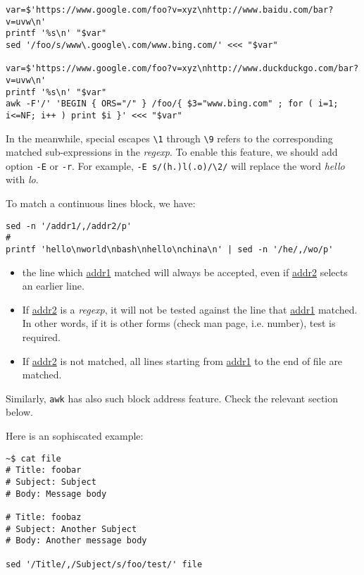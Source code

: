 \begin{minipage}{1.0\linewidth}
\begin{lstlisting}
var=$'https://www.google.com/foo?v=xyz\nhttp://www.baidu.com/bar?v=uvw\n'
printf '%s\n' "$var"
sed '/foo/s/www\.google\.com/www.bing.com/' <<< "$var"

var=$'https://www.google.com/foo?v=xyz\nhttp://www.duckduckgo.com/bar?v=uvw\n'
printf '%s\n' "$var"
awk -F'/' 'BEGIN { ORS="/" } /foo/{ $3="www.bing.com" ; for ( i=1; i<=NF; i++ ) print $i }' <<< "$var"
\end{lstlisting}
\end{minipage}

In the meanwhile, special escapes \lstinline|\1| through
\lstinline|\9| refers to the corresponding matched sub-expressions
in the \textit{regexp}. To enable this feature, we should add
option \lstinline|-E| or \lstinline|-r|. For example,
\lstinline|-E s/(h.)l(.o)/\2/| will replace the word
\textit{hello} with \textit{lo}.

To match a continuous lines block, we have:

\begin{lstlisting}
sed -n '/addr1/,/addr2/p'
#
printf 'hello\nworld\nbash\nhello\nchina\n' | sed -n '/he/,/wo/p'
\end{lstlisting}

\begin{itemize}
\item the line which \uline{addr1} matched will always be
  accepted, even if \uline{addr2} selects an earlier line.
\item If \uline{addr2} is a \textit{regexp}, it will not be tested
  against the line that \uline{addr1} matched. In other words, if
  it is other forms (check man page, i.e. number), test is
  required.
\item If \uline{addr2} is not matched, all lines starting from
  \uline{addr1} to the end of file are matched.
\end{itemize}

Similarly, \lstinline|awk| has also such block address
feature. Check the relevant section below.

Here is an sophiscated example:

\begin{lstlisting}
~$ cat file
# Title: foobar
# Subject: Subject
# Body: Message body

# Title: foobaz
# Subject: Another Subject
# Body: Another message body

sed '/Title/,/Subject/s/foo/test/' file
\end{lstlisting}

